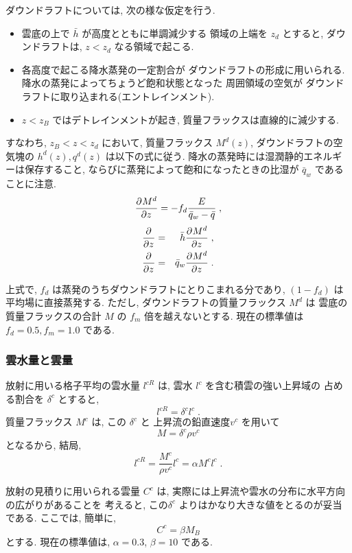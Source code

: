 ダウンドラフトについては, 次の様な仮定を行う.
\begin{itemize}
\item 雲底の上で $\bar{h}$ が高度とともに単調減少する
      領域の上端を $z_d$ とすると, ダウンドラフトは,
      $z < z_d$ なる領域で起こる.
\item 各高度で起こる降水蒸発の一定割合が
      ダウンドラフトの形成に用いられる.
      降水の蒸発によってちょうど飽和状態となった
      周囲領域の空気が
      ダウンドラフトに取り込まれる(エントレインメント).
\item $z < z_B$ ではデトレインメントが起き,
      質量フラックスは直線的に減少する.
\end{itemize}

すなわち, $z_B < z < z_d$ において, 質量フラックス $M^d(z)$, 
ダウンドラフトの空気塊の $h^d(z),q^d(z)$ は以下の式に従う.
降水の蒸発時には湿潤静的エネルギーは保存すること,
ならびに蒸発によって飽和になったときの比湿が
$\bar{q}_{w}$ であることに注意. 
\begin{equation}
  \DP{M^d}{z} =  - f_d \frac{E}{\bar{q}_{w}-\bar{q}} \;  ,
\end{equation}
\begin{eqnarray}
  \DP{}{z} ( M^d h^d ) & = & \bar{h}     \DP{M^d}{z} \; ,\\
  \DP{}{z} ( M^d q^d ) & = & \bar{q}_{w} \DP{M^d}{z} \; .
\end{eqnarray}

上式で, $f_d$ は蒸発のうちダウンドラフトにとりこまれる分であり,
$(1-f_d)$ は平均場に直接蒸発する. 
ただし, ダウンドラフトの質量フラックス $M^d$ は
雲底の質量フラックスの合計 $M$ の $f_m$ 倍を越えないとする.
現在の標準値は $f_d=0.5, f_m=1.0$ である.

\subsubsection{雲水量と雲量}

放射に用いる格子平均の雲水量 $l^{cR}$ は, 
雲水 $l^c$ を含む積雲の強い上昇域の
占める割合を $\delta^c$ とすると,
\begin{equation}
  l^{cR} = \delta^c l^c \; .
\end{equation}
質量フラックス $M^c$ は, この $\delta^c$ と
上昇流の鉛直速度$v^c$ を用いて
\begin{equation}
  M = \delta^c \rho v^c 
\end{equation}
となるから, 結局,
\begin{equation}
  l^{cR} = \frac{M^c}{\rho v^c} l^c = \alpha M^c l^c \; .
\end{equation}

放射の見積りに用いられる雲量 $C^c$  は, 
実際には上昇流や雲水の分布に水平方向の広がりがあることを
考えると, この$\delta^c$  よりはかなり大きな値をとるのが妥当である.
ここでは, 簡単に, 
\begin{equation}
  C^c = \beta M_B
\end{equation}
とする.
現在の標準値は, $\alpha=0.3$, $\beta=10$ である.
